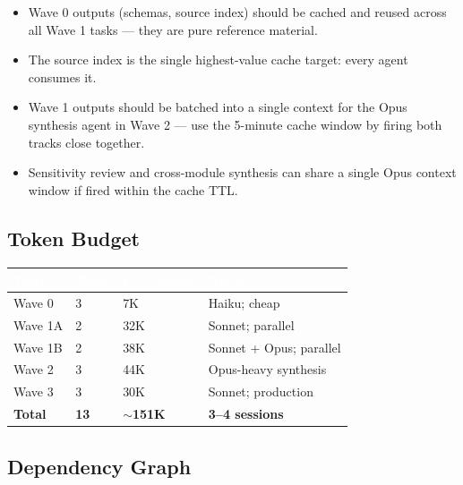 \documentclass[11pt,letterpaper]{article}
\newcommand{\tableheader}[1]{\textbf{\sffamily\textcolor{white}{#1}}}
\begin{document}
\begin{itemize}[noitemsep]
  \item Wave 0 outputs (schemas, source index) should be cached and reused across all Wave 1 tasks --- they are pure reference material.
  \item The source index is the single highest-value cache target: every agent consumes it.
  \item Wave 1 outputs should be batched into a single context for the Opus synthesis agent in Wave 2 --- use the 5-minute cache window by firing both tracks close together.
  \item Sensitivity review and cross-module synthesis can share a single Opus context window if fired within the cache TTL.
\end{itemize}

\subsection{Token Budget}

\begin{center}
\begin{tabularx}{\textwidth}{L{4cm}C{2cm}C{2cm}X}
\toprule
{}
\tableheader{Wave} & \tableheader{Tasks} & \tableheader{Est. Tokens} & \tableheader{Notes} \\
\midrule
Wave 0 & 3 & 7K & Haiku; cheap \\
Wave 1A & 2 & 32K & Sonnet; parallel \\
Wave 1B & 2 & 38K & Sonnet + Opus; parallel \\
Wave 2 & 3 & 44K & Opus-heavy synthesis \\
Wave 3 & 3 & 30K & Sonnet; production \\
\midrule
\textbf{Total} & \textbf{13} & \textbf{$\sim$151K} & \textbf{3--4 sessions} \\
\bottomrule
\end{tabularx}
\end{center}

\subsection{Dependency Graph}
\end{document}
